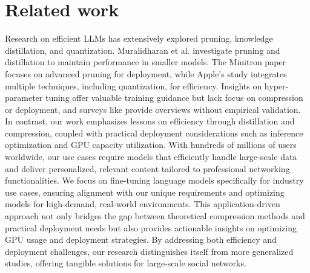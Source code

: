 \section{Related work}
\label{section:rel_work}

Research on efficient LLMs has extensively explored pruning, knowledge distillation, and quantization. Muralidharan et al. \cite{muralidharan2024compact} investigate pruning and distillation to maintain performance in smaller models. The Minitron paper \cite{muralidharan2024minitron} focuses on advanced pruning for deployment, while Apple's study \cite{gunter2024apple} integrates multiple techniques, including quantization, for efficiency. Insights on hyper-parameter tuning \cite{ashkboos2024computational, pareja2024unveiling} offer valuable training guidance but lack focus on compression or deployment, and surveys like \cite{zhu2023survey} provide overviews without empirical validation. In contrast, our work emphasizes lessons on efficiency through distillation and compression, coupled with practical deployment considerations such as inference optimization and GPU capacity utilization. With hundreds of millions of users worldwide, our use cases require models that efficiently handle large-scale data and deliver personalized, relevant content tailored to professional networking functionalities. We focus on fine-tuning language models specifically for industry use cases, ensuring alignment with our unique requirements and optimizing models for high-demand, real-world environments. This application-driven approach not only bridges the gap between theoretical compression methods and practical deployment needs but also provides actionable insights on optimizing GPU usage and deployment strategies. By addressing both efficiency and deployment challenges, our research distinguishes itself from more generalized studies, offering tangible solutions for large-scale social networks.